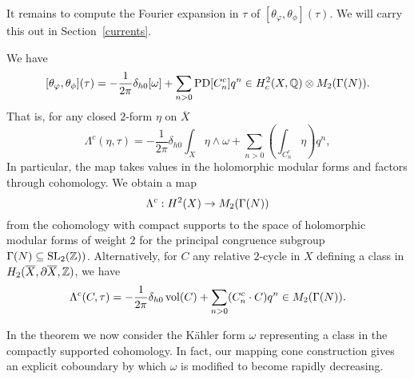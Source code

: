 It remains to compute the Fourier expansion in $\tau$ of $[\theta_{\varphi}, \theta_{\phi}](\tau)$. We will carry this out in Section~\ref{currents}. 

\begin{theorem}\label{FM-main-th}
We have 
\[
[\theta_{\varphi}, \theta_{\phi}](\tau) =  -\frac{1}{2\pi}\delta_{h0} [\omega] + \sum_{n>0} \operatorname{PD}[C^c_n] q^n \in H_c^2(X,\mathbb{Q}) \otimes M_2(\Gamma(N)).
\]
That is, for any closed $2$-form $\eta$ on $\overline{X}$
\[
\Lambda^c(\eta,\tau) = -\frac{1}{2\pi}\delta_{h0} \int_X \eta \wedge \omega + \sum_{n>0} \left( \int_{C^c_n} \eta \right)q^n,
\]
In particular, the map takes values in the holomorphic modular forms and factors through cohomology. We obtain a map
\begin{equation}
\Lambda^c: H^{2}(X) \to M_{2}(\Gamma(N))
\end{equation}
from the cohomology with compact supports to the space of holomorphic modular forms of weight $2$ for the principal congruence subgroup $\Gamma(N) \subseteq \operatorname{SL}_2(\mathbb{Z}))$.
Alternatively, for $C$ any relative $2$-cycle in $X$ defining a class in $H_2(\overline{X},\partial \overline{X},\mathbb{Z})$, we have
\[
\Lambda^c(C,\tau) = -\frac{1}{2\pi}\delta_{h0} \operatorname{vol}(C) + \sum_{n>0} ( C^c_n \cdot C ) q^n \in M_2(\Gamma(N)).
\]
\end{theorem}

\begin{remark}
In the theorem we now consider the K\"ahler form $\omega$ representing a class in the compactly supported cohomology. In fact, our mapping cone construction gives an explicit coboundary by which $\omega$ is modified to become rapidly decreasing. 
\end{remark}
